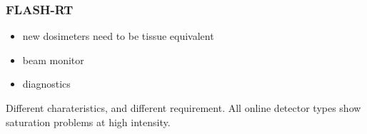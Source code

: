     \begin{frame}
        \frametitle{FLASH-RT}
        \begin{itemize}
            \item new dosimeters need to be tissue equivalent 
            \item beam monitor
            \item diagnostics
        \end{itemize}
        Different charateristics, and different requirement. 
        All online detector types show saturation problems at high intensity.


    \end{frame}     
